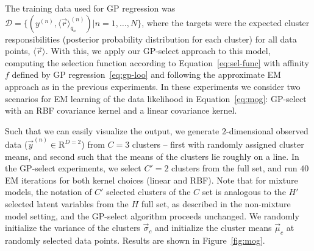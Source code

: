 The training data used for GP regression was $\mathcal{D} = \{ (y^{(n)}, \langle \vec{r}\rangle_{q_{n}}^{(n)}) | n = 1, \dots, N \}$, where the targets were the expected cluster responsibilities (posterior probability distribution for each cluster) for all data points, $\langle \vec{r} \rangle$.
With this, we apply our GP-select approach to this model, computing the selection function according to Equation~\eqref{eq:sel-func} with affinity $f$ defined by GP regression~\eqref{eq:gp-loo} 
and following the approximate EM approach as in the previous experiments.
%
In these experiments we consider two scenarios for EM learning of the data likelihood in Equation~\eqref{eq:mog}: GP-select with an RBF covariance kernel and a linear covariance kernel.%
%

Such that we can easily visualize the output, we generate $2$-dimensional observed data ($\vec{y}^{(n)} \in \mathrm{R}^{D=2} $) from $C=3$ clusters -- first with randomly assigned cluster means, and second such that the means of the clusters lie roughly on a line.
In the GP-select experiments, we select $C' = 2$ clusters from the full set,
and run $40$ EM iterations for both kernel choices (linear and RBF).
Note that for mixture models, the notation of $C'$ selected clusters of the $C$ set is analogous to the $H'$ selected latent variables from the $H$ full set, as described in the non-mixture model setting, and the GP-select algorithm proceeds unchanged.
We randomly initialize the variance of the clusters $\vec{\sigma}_c$ and initialize the cluster means $\vec{\mu}_c$ at randomly selected data points.
Results are shown in Figure~\ref{fig:mog}.

